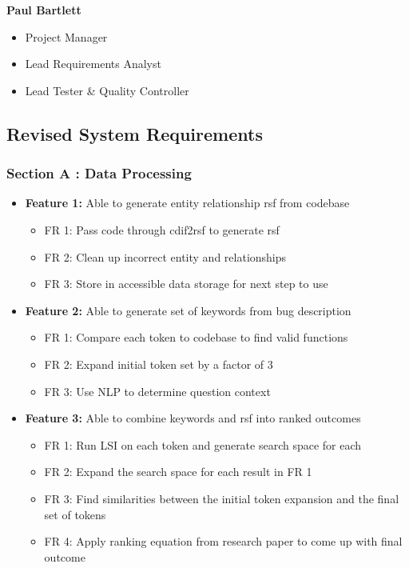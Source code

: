 \documentclass[11pt,]{article}
\providecommand{\tightlist}{%
  \setlength{\itemsep}{0pt}\setlength{\parskip}{0pt}}
\begin{document}
\textbf{Paul Bartlett}

\begin{itemize}
\item
  Project Manager
\item
  Lead Requirements Analyst
\item
  Lead Tester \& Quality Controller
\end{itemize}

\hypertarget{revised-system-requirements}{%
\subsection{Revised System
Requirements}\label{revised-system-requirements}}

\hypertarget{section-a-data-processing}{%
\subsubsection{Section A : Data
Processing}\label{section-a-data-processing}}

\begin{itemize}
\tightlist
\item
  \textbf{Feature 1:} Able to generate entity relationship rsf from
  codebase

  \begin{itemize}
  \tightlist
  \item
    FR 1: Pass code through cdif2rsf to generate rsf
  \item
    FR 2: Clean up incorrect entity and relationships
  \item
    FR 3: Store in accessible data storage for next step to use
  \end{itemize}
\item
  \textbf{Feature 2:} Able to generate set of keywords from bug
  description

  \begin{itemize}
  \tightlist
  \item
    FR 1: Compare each token to codebase to find valid functions
  \item
    FR 2: Expand initial token set by a factor of 3
  \item
    FR 3: Use NLP to determine question context
  \end{itemize}
\item
  \textbf{Feature 3:} Able to combine keywords and rsf into ranked
  outcomes

  \begin{itemize}
  \tightlist
  \item
    FR 1: Run LSI on each token and generate search space for each
  \item
    FR 2: Expand the search space for each result in FR 1
  \item
    FR 3: Find similarities between the initial token expansion and the
    final set of tokens
  \item
    FR 4: Apply ranking equation from research paper to come up with
    final outcome
  \end{itemize}
\end{itemize}
\end{document}

